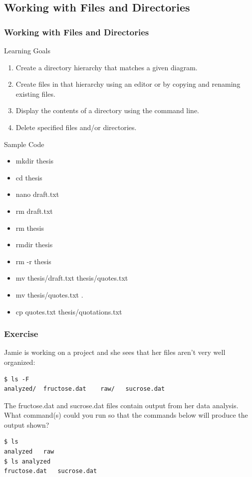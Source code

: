 \documentclass{beamer}
\begin{document}
\subsection*{Working with Files and Directories}
\begin{frame}
\frametitle{Working with Files and Directories}
\small{
\begin{block}{Learning Goals}

\begin{enumerate}
\item    Create a directory hierarchy that matches a given diagram.
\item    Create files in that hierarchy using an editor or by copying and renaming existing files.
\item    Display the contents of a directory using the command line.
\item    Delete specified files and/or directories.
\end{enumerate}
\end{block}
\begin{block}{Sample Code}
\begin{multicols}{2}
\begin{itemize}
\item mkdir thesis
\item cd thesis
\item nano draft.txt
\item rm draft.txt
\item rm thesis
\item rmdir thesis
\item rm -r thesis
\item mv thesis/draft.txt thesis/quotes.txt
\item mv thesis/quotes.txt .
\item cp quotes.txt thesis/quotations.txt
\end{itemize}
\end{multicols}
\end{block}}
\end{frame}


\begin{frame}[fragile]
\frametitle{Exercise}
Jamie is working on a project and she sees that her files aren’t very well organized:
\begin{verbatim}
$ ls -F
analyzed/  fructose.dat    raw/   sucrose.dat
\end{verbatim}
The fructose.dat and sucrose.dat files contain output from her data analysis.
What command(s) could you run so that the commands below will produce the output shown?
\begin{verbatim}
$ ls
analyzed   raw
$ ls analyzed
fructose.dat   sucrose.dat
\end{verbatim}
\end{frame}
\end{document}
